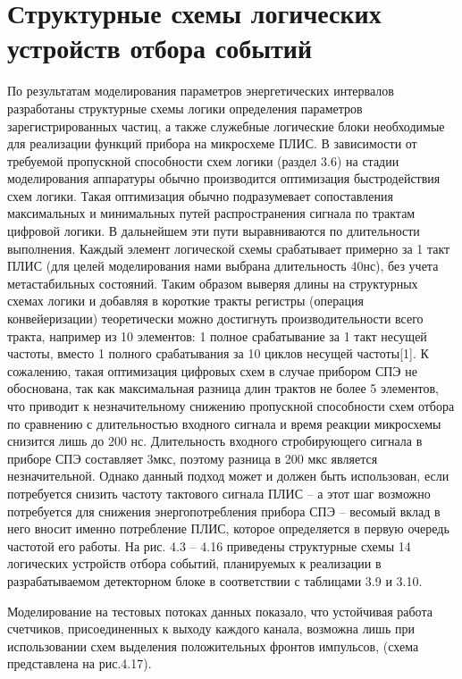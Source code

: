 \section{Структурные схемы логических устройств отбора событий}
По результатам моделирования параметров энергетических интервалов разработаны структурные схемы логики определения параметров зарегистрированных частиц, а также служебные логические блоки необходимые для реализации функций прибора на микросхеме ПЛИС. 
В зависимости от требуемой пропускной способности схем логики (раздел 3.6) на стадии моделирования аппаратуры обычно производится оптимизация быстродействия схем логики. Такая оптимизация обычно подразумевает сопоставления максимальных и минимальных путей распространения сигнала по трактам цифровой логики. В дальнейшем эти пути выравниваются по длительности выполнения. Каждый элемент логической схемы срабатывает примерно за 1 такт ПЛИС (для целей моделирования нами выбрана длительность 40нс), без учета метастабильных состояний. Таким образом выверяя длины на структурных схемах логики и добавляя в короткие тракты регистры (операция конвейеризации) теоретически можно достигнуть производительности всего тракта, например из 10 элементов: 1 полное срабатывание за 1 такт несущей частоты, вместо 1 полного срабатывания за 10 циклов несущей частоты[1]. К сожалению, такая оптимизация цифровых схем в случае  прибором СПЭ не обоснована, так как максимальная разница длин трактов не более 5 элементов, что приводит к незначительному снижению пропускной способности схем отбора по сравнению с длительностью входного сигнала и время реакции микросхемы снизится лишь до 200 нс. Длительность входного стробирующего сигнала в приборе СПЭ составляет 3мкс, поэтому разница в 200 мкс является незначительной. Однако данный подход может и должен быть использован, если потребуется снизить частоту тактового сигнала ПЛИС – а этот шаг возможно потребуется для снижения энергопотребления прибора СПЭ – весомый вклад в него вносит именно потребление ПЛИС, которое определяется в первую очередь частотой его работы.
На рис. 4.3 – 4.16 приведены структурные схемы 14 логических устройств отбора событий, планируемых к реализации в разрабатываемом детекторном блоке в соответствии с таблицами 3.9 и 3.10.



Моделирование на тестовых потоках данных показало, что устойчивая работа счетчиков, присоединенных к выходу каждого канала, возможна лишь при использовании схем выделения положительных фронтов импульсов, (схема представлена на рис.4.17).

